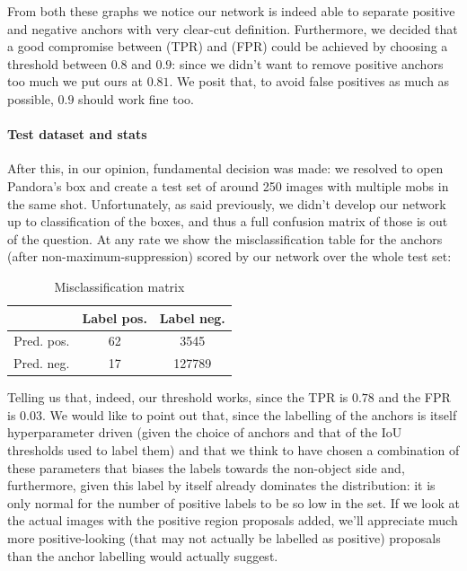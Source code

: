 \documentclass[10pt,journal,cspaper,compsoc]{IEEEtran}
\begin{document}
    From both these graphs we notice our network is indeed able to separate positive and negative anchors with very clear-cut definition. Furthermore, we decided that a good compromise between (TPR) and (FPR) could be achieved by choosing a threshold between $0.8$ and $0.9$: since we didn't want to remove positive anchors too much we put ours at $0.81$. We posit that, to avoid false positives as much as possible, $0.9$ should work fine too.

    \paragraph{Test dataset and stats} After this, in our opinion, fundamental decision was made: we resolved to open Pandora's box and create a test set of around 250 images with multiple mobs in the same shot. Unfortunately, as said previously, we didn't develop our network up to classification of the boxes, and thus a full confusion matrix of those is out of the question. At any rate we show the misclassification table for the anchors (after non-maximum-suppression) scored by our network over the whole test set:

    \begin{table}[htb]
        \centering
        \caption{Misclassification matrix}
        \begin{tabularx}{.3\textwidth}{r|c c}\label{tab:miscl}
            & Label pos. & Label neg. \\
            \hline
            Pred. pos. & 62 & 3545 \\
            Pred. neg. & 17 & 127789
        \end{tabularx}
    \end{table}

    Telling us that, indeed, our threshold works, since the TPR is $0.78$ and the FPR is $0.03$. We would like to point out that, since the labelling of the anchors is itself hyperparameter driven (given the choice of anchors and that of the IoU thresholds used to label them) and that we think to have chosen a combination of these parameters that biases the labels towards the non-object side and, furthermore, given this label by itself already dominates the distribution: it is only normal for the number of positive labels to be so low in the set. If we look at the actual images with the positive region proposals added, we'll appreciate much more positive-looking (that may not actually be labelled as positive) proposals than the anchor labelling would actually suggest.
\end{document}
